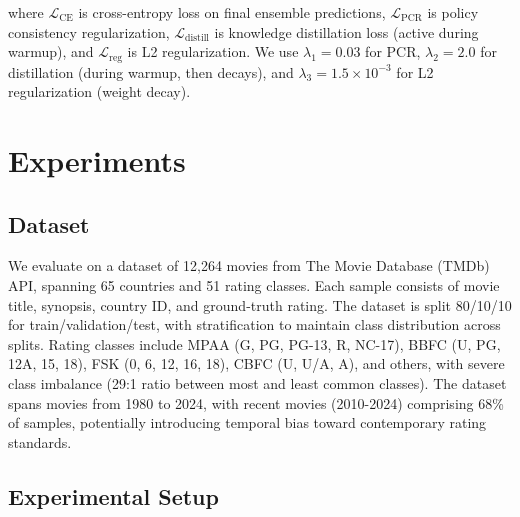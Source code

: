 \documentclass[11pt]{article}
\begin{document}
where $\mathcal{L}_{\text{CE}}$ is cross-entropy loss on final ensemble predictions, $\mathcal{L}_{\text{PCR}}$ is policy consistency regularization, $\mathcal{L}_{\text{distill}}$ is knowledge distillation loss (active during warmup), and $\mathcal{L}_{\text{reg}}$ is L2 regularization. We use $\lambda_1 = 0.03$ for PCR, $\lambda_2 = 2.0$ for distillation (during warmup, then decays), and $\lambda_3 = 1.5 \times 10^{-3}$ for L2 regularization (weight decay).

\section{Experiments}


\subsection{Dataset}

We evaluate on a dataset of 12,264 movies from The Movie Database (TMDb) API, spanning 65 countries and 51 rating classes. Each sample consists of movie title, synopsis, country ID, and ground-truth rating. The dataset is split 80/10/10 for train/validation/test, with stratification to maintain class distribution across splits. Rating classes include MPAA (G, PG, PG-13, R, NC-17), BBFC (U, PG, 12A, 15, 18), FSK (0, 6, 12, 16, 18), CBFC (U, U/A, A), and others, with severe class imbalance (29:1 ratio between most and least common classes). The dataset spans movies from 1980 to 2024, with recent movies (2010-2024) comprising 68\% of samples, potentially introducing temporal bias toward contemporary rating standards.

\subsection{Experimental Setup}
\end{document}

